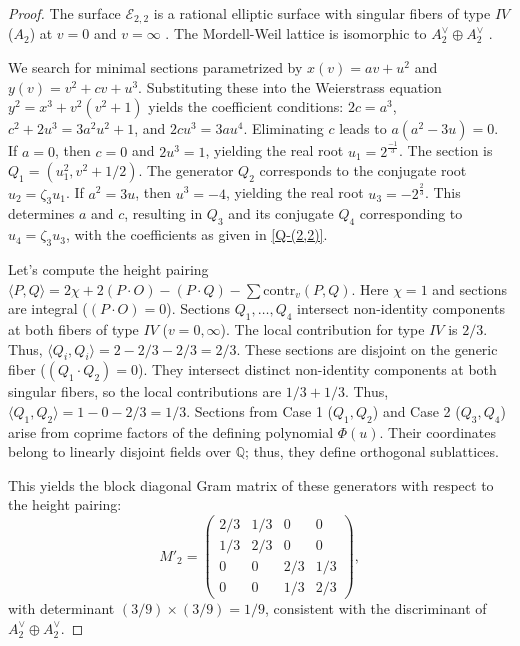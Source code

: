 \documentclass[11pt]{amsart}
\newcommand{\Ee}{{\mathcal E}}
\numberwithin{equation}{section}
\numberwithin{table}{section}
\newcommand\<{\langle}
\begin{document}
\begin{proof}
	The surface $\Ee_{2,2}$ is a rational elliptic surface with singular fibers of type $IV$ ($A_2$) at $v=0$ and $v=\infty$ \cite[Sect. 5.8]{Schuett2019}. The Mordell-Weil lattice is isomorphic to $A_2^\vee \oplus A_2^\vee$ \cite[Table 8.2, No. 11]{Schuett2019}.
	
	We search for minimal sections parametrized by $x(v)=av+u^2$ and $y(v)=v^2+cv+u^3$. Substituting these into the Weierstrass equation $y^2 = x^3 + v^2(v^2+1)$ yields the coefficient conditions: $2c = a^3$, $c^2+2u^3 = 3a^2u^2+1$, and $2cu^3 = 3au^4$.
	Eliminating $c$ leads to $a(a^2-3u)=0$.
If $a=0$, then  $c=0$ and $2u^3=1$, yielding the real root $u_1 = 2^{\frac{-1}{3}}$. 
The section is $Q_1 = (u_1^2, v^2 + 1/2)$. The generator $Q_2$ corresponds to the conjugate root $u_2 = \zeta_3 u_1$.
If $a^2=3u$, then  $u^3 = -4$, yielding the real root $u_3 = -2^{\frac{2}{3}} $. This determines $a$ and $c$, resulting in $Q_3$ and its conjugate $Q_4$ corresponding to $u_4 =\zeta_3 u_3$, with the coefficients as given in \ref{Q-(2,2)}.
	
	Let's compute the height pairing $\langle P, Q \rangle = 2\chi + 2(P \cdot O) - (P \cdot Q) - \sum \text{contr}_v(P, Q)$. 
	Here $\chi=1$ and sections are integral ($(P \cdot O)=0$).
  Sections $Q_1, \dots, Q_4$ intersect non-identity components at both fibers of type $IV$ ($v=0, \infty$). The local contribution for type $IV$ is $2/3$. Thus, $\langle Q_i, Q_i \rangle = 2 - 2/3 - 2/3 = 2/3$.
   These sections are disjoint on the generic fiber ($(Q_1 \cdot Q_2)=0$). They intersect distinct non-identity components at both singular fibers, so the local contributions are $1/3 + 1/3$. Thus, $\langle Q_1, Q_2 \rangle = 1 - 0 - 2/3 = 1/3$.
  Sections from Case 1 ($Q_1, Q_2$) and Case 2 ($Q_3, Q_4$) arise from coprime factors of the defining polynomial $\Phi(u)$. Their coordinates belong to linearly disjoint fields over $\mathbb{Q}$; thus, they define orthogonal sublattices.
 
	This yields the block diagonal Gram matrix    of these generators with respect to the height pairing:
	\[
	M'_2 = \begin{pmatrix}
		2/3 & 1/3 & 0 & 0 \\
		1/3 & 2/3 & 0 & 0 \\
		0 & 0 & 2/3 & 1/3 \\
		0 & 0 & 1/3 & 2/3
	\end{pmatrix},
	\]	
	 with determinant $(3/9) \times (3/9) = 1/9$, consistent with the discriminant of $A_2^\vee \oplus A_2^\vee$.
\end{proof}
\end{document}
